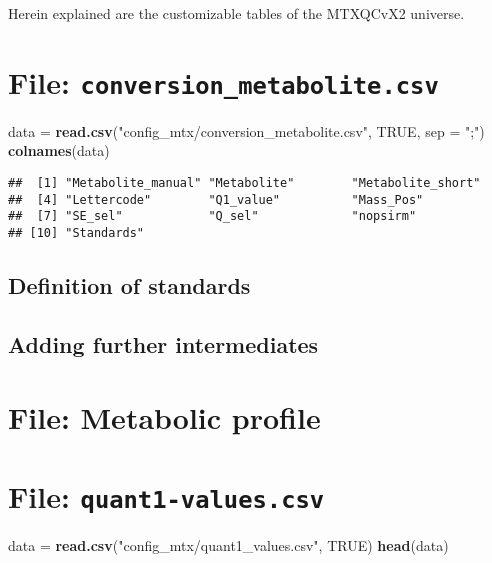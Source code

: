 \documentclass[]{book}
\newenvironment{Shaded}{\begin{snugshade}}{\end{snugshade}}
\newcommand{\KeywordTok}[1]{\textcolor[rgb]{0.13,0.29,0.53}{\textbf{#1}}}
\newcommand{\DataTypeTok}[1]{\textcolor[rgb]{0.13,0.29,0.53}{#1}}
\newcommand{\StringTok}[1]{\textcolor[rgb]{0.31,0.60,0.02}{#1}}
\newcommand{\OtherTok}[1]{\textcolor[rgb]{0.56,0.35,0.01}{#1}}
\newcommand{\NormalTok}[1]{#1}
\theoremstyle{definition}
\theoremstyle{definition}
\theoremstyle{definition}
\theoremstyle{remark}
\begin{document}
Herein explained are the customizable tables of the MTXQCvX2 universe.

\section{\texorpdfstring{File:
\texttt{conversion\_metabolite.csv}}{File: conversion\_metabolite.csv}}\label{file-conversion_metabolite.csv}

\begin{Shaded}
\begin{Highlighting}[]
\NormalTok{data =}\StringTok{ }\KeywordTok{read.csv}\NormalTok{(}\StringTok{"config_mtx/conversion_metabolite.csv"}\NormalTok{, }\OtherTok{TRUE}\NormalTok{, }\DataTypeTok{sep =} \StringTok{";"}\NormalTok{)}
\KeywordTok{colnames}\NormalTok{(data)}
\end{Highlighting}
\end{Shaded}

\begin{verbatim}
##  [1] "Metabolite_manual" "Metabolite"        "Metabolite_short" 
##  [4] "Lettercode"        "Q1_value"          "Mass_Pos"         
##  [7] "SE_sel"            "Q_sel"             "nopsirm"          
## [10] "Standards"
\end{verbatim}

\subsection{Definition of standards}\label{definition-of-standards}

\subsection{Adding further
intermediates}\label{adding-further-intermediates}

\section{File: Metabolic profile}\label{file-metabolic-profile}

\section{\texorpdfstring{File:
\texttt{quant1-values.csv}}{File: quant1-values.csv}}\label{file-quant1-values.csv}

\begin{Shaded}
\begin{Highlighting}[]
\NormalTok{data =}\StringTok{ }\KeywordTok{read.csv}\NormalTok{(}\StringTok{"config_mtx/quant1_values.csv"}\NormalTok{, }\OtherTok{TRUE}\NormalTok{)}
\KeywordTok{head}\NormalTok{(data)}
\end{Highlighting}
\end{Shaded}
\end{document}

